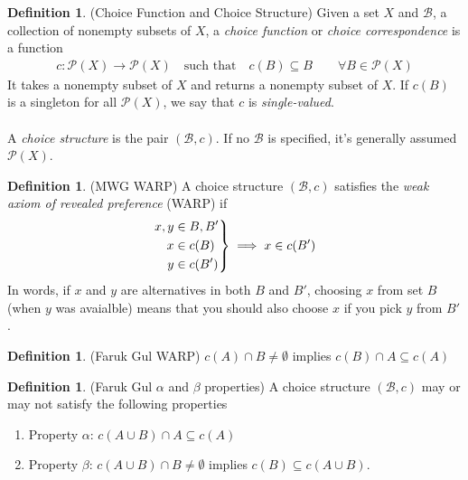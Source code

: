 \documentclass[12pt]{article}
\theoremstyle{plain}
\theoremstyle{definition}
\newtheorem{defn}[thm]{Definition}
\theoremstyle{remark}
\newcommand{\ra}{\rightarrow}
\newcommand{\calB}{\mathcal{B}}
\newcommand{\calP}{\mathcal{P}}
\newenvironment{rcases}
  {\left.\begin{aligned}}
  {\end{aligned}\right\rbrace}
\begin{document}
\begin{defn}(Choice Function and Choice Structure)
Given a set $X$ and $\calB$, a collection of nonempty subsets of $X$, a
\emph{choice function} or \emph{choice correspondence} is a function
\begin{align*}
  c: \calP(X) \ra \calP(X)
  \quad\text{such that}\quad
  c(B) \subseteq B \qquad \forall B\in\calP(X)
\end{align*}
It takes a nonempty subset of $X$ and returns a nonempty subset of $X$.
If $c(B)$ is a singleton for all $\calP(X)$, we say that $c$ is
\emph{single-valued}.
\\
\\
A \emph{choice structure} is the pair $(\calB,c)$. If no $\calB$ is
specified, it's generally assumed $\calP(X)$.
\end{defn}

\begin{defn}(MWG WARP)
A choice structure $(\calB,c)$ satisfies the
\emph{weak axiom of revealed preference} (WARP) if
\begin{align*}
  \begin{rcases}
    x,y &\in B,B' \\
    x &\in c(B) \\
    y &\in c(B')
  \end{rcases}
  \implies
  x \in c(B')
\end{align*}
In words, if $x$ and $y$ are alternatives in both $B$ and $B'$, choosing
$x$ from set $B$ (when $y$ was avaialble) means that you should also
choose $x$ if you pick $y$ from $B'$.
\end{defn}

\begin{defn}(Faruk Gul WARP)
$c(A)\cap B\neq \emptyset$ implies $c(B)\cap A\subseteq c(A)$
\end{defn}

\begin{defn}(Faruk Gul $\alpha$ and $\beta$ properties)
A choice structure $(\calB,c)$ may or may not satisfy the following
properties
\begin{enumerate}
  \item Property $\alpha$: $c(A\cup B) \cap A \subseteq c(A)$

  \item Property $\beta$: $c(A\cup B) \cap B\neq\emptyset$ implies
    $c(B)\subseteq c(A\cup B)$.
\end{enumerate}
\end{defn}
\end{document}
